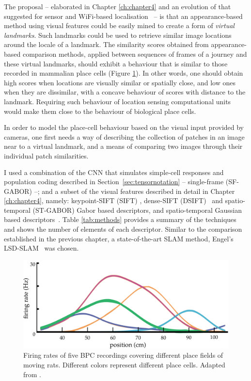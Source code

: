 The proposal -- elaborated in Chapter \ref{ch:chapter4} and an evolution of that suggested for sensor and WiFi-based localisation~\cite{wang2012no} -- is that an appearance-based method using visual features could be easily mined to create a form of \textit{virtual landmarks}.  Such landmarks could be used to retrieve similar image locations around the locale of a landmark. The similarity scores obtained from appearance-based comparison methods, applied between sequences of frames of a journey and these virtual landmarks, should exhibit a behaviour that is similar to those recorded in mammalian place cells (Figure \ref{fig:BPCdragoi}). In other words, one should obtain high scores when locations are visually similar or spatially close, and low ones when they are dissimilar, with a concave behaviour of scores with distance to the landmark. Requiring such behaviour of location sensing computational units would make them close to the behaviour of biological place cells. 

In order to model the place-cell behaviour based on the visual input provided by cameras, one first needs a way of describing the collection of patches in an image near to a virtual landmark, and a means of comparing two images through their individual patch similarities. 

I used a combination of the CNN that simulates simple-cell responses and population coding described in Section~\ref{sec:tensornotation} -- single-frame (SF-GABOR) --; and a subset of the visual features described in detail in Chapter \ref{ch:chapter4}, namely: keypoint-SIFT (SIFT) \cite{lowe2004distinctive}, dense-SIFT (DSIFT)~\cite{vedaldi2010vlfeat} and spatio-temporal (ST-GABOR) Gabor based descriptors, and spatio-temporal Gaussian based descriptors~\cite{RiveraWearable}. Table \ref{tab:methods} provides a summary of the techniques and shows the number of elements of each descriptor. Similar to the comparison established in the previous chapter, a state-of-the-art SLAM method, Engel's LSD-SLAM~\cite{engel2014lsd} was chosen.


\begin{figure}[]
\includegraphics[width=\linewidth]{gfx/Chapter05/dragoi_et_al_place_cell.pdf}
\caption{Firing rates of five BPC recordings covering different place fields of moving rats. Different colors represent different place cells. Adapted from \citep{dragoi2014selection}.}
\label{fig:BPCdragoi}
\end{figure}

